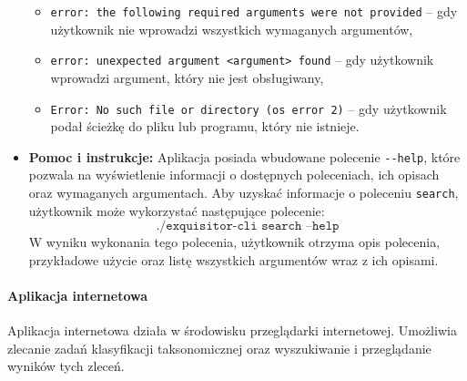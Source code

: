 \begin{itemize}
{\begin{itemize}
                            \item {
                                \texttt{error: the following required arguments were not provided} – gdy użytkownik nie wprowadzi wszystkich wymaganych argumentów,
                            }
                            \item {
                                \texttt{error: unexpected argument <argument> found} – gdy użytkownik wprowadzi argument, który nie jest obsługiwany,
                            }
                            \item {
                                \texttt{Error: No such file or directory (os error 2)} – gdy użytkownik podał ścieżkę do pliku lub programu, który nie istnieje.
                            }
                        \end{itemize}
                    }
                    \item {
                        \textbf{Pomoc i instrukcje:}
                        Aplikacja posiada wbudowane polecenie \texttt{-\phantom{}-help}, które pozwala na wyświetlenie informacji o dostępnych poleceniach, ich opisach oraz wymaganych argumentach.
                        Aby uzyskać informacje o poleceniu \texttt{search}, użytkownik może wykorzystać następujące polecenie: 
                        \[
                            \texttt{./exquisitor-cli search --help}
                        \]
                        W wyniku wykonania tego polecenia, użytkownik otrzyma opis polecenia, przykładowe użycie oraz listę wszystkich argumentów wraz z ich opisami.
                    }

                \end{itemize}

            \paragraph{Aplikacja internetowa}
                Aplikacja internetowa działa w środowisku przeglądarki internetowej. Umożliwia zlecanie zadań klasyfikacji taksonomicznej oraz wyszukiwanie i przeglądanie wyników tych zleceń.

